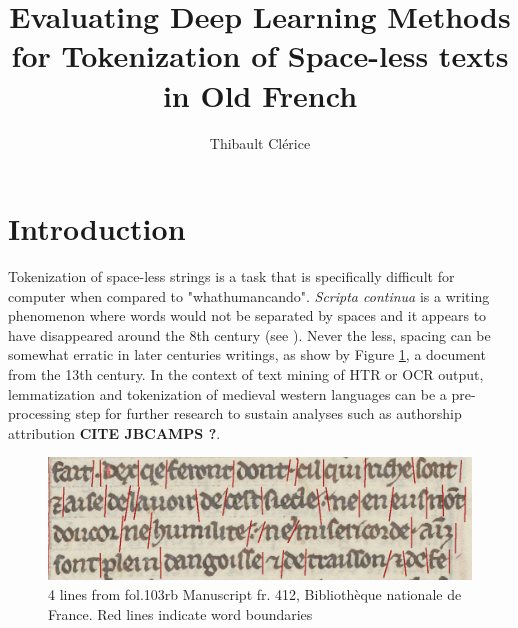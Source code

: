\documentclass{jdmdh}
\title{Evaluating Deep Learning Methods for Tokenization of Space-less texts in Old French}
\author[1]{Thibault Clérice}
\affil[1]{École nationale des Chartes, France}
\affil[2]{Université Lyon 3, France}
\begin{document}
\maketitle



\section{Introduction}


Tokenization of space-less strings is a task that is specifically difficult for computer when compared to "whathumancando". \textit{Scripta continua} is a writing phenomenon where words would not be separated by spaces and it appears to have disappeared around the 8th century (see \citet{zanna1998lecture}). Never the less, spacing can be somewhat erratic in later centuries writings, as show by Figure \ref{fig:4lines}, a document from the 13th century. In the context of text mining of HTR or OCR output, lemmatization and tokenization of medieval western languages can be a pre-processing step for further research to sustain analyses such as authorship attribution \textbf{CITE JBCAMPS ?}.

\begin{figure}[!ht]
  \centering
  \includegraphics[width=\linewidth]{4-lines-p0215.png}

  \caption{ 4 lines from fol.103rb Manuscript fr. 412, Bibliothèque nationale de France.  Red lines indicate word boundaries}
  \label{fig:4lines}
\end{figure}
\end{document}
